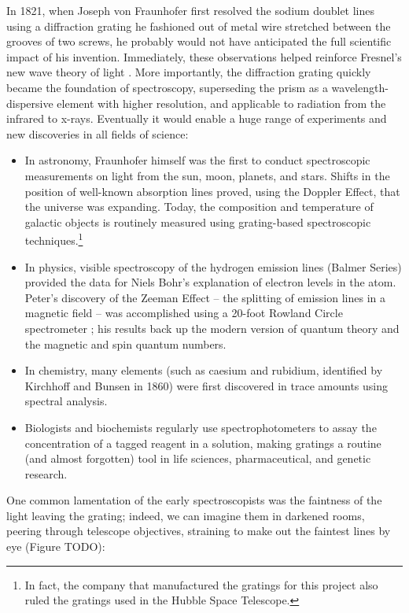 In 1821, when Joseph von Fraunhofer first resolved the sodium doublet lines using a diffraction grating he fashioned out of metal wire stretched between the grooves of two screws, he probably would not have anticipated the full scientific impact of his invention.
Immediately, these observations helped reinforce Fresnel's new wave theory of light \cite{Fra23}. %
More importantly, the diffraction grating quickly became the foundation of spectroscopy, superseding the prism as a wavelength-dispersive element with higher resolution, and applicable to radiation from the infrared to x-rays.  Eventually it would enable a huge range of experiments and new discoveries in all fields of science:
\begin{itemize}
\item In astronomy, Fraunhofer himself was the first to conduct spectroscopic measurements on light from the sun, moon, planets, and stars.  Shifts in the position of well-known absorption lines proved, using the Doppler Effect, that the universe was expanding.  Today, the composition and temperature of galactic objects is routinely measured using grating-based spectroscopic techniques.\footnote{In fact, the company that manufactured the gratings for this project also ruled the gratings used in the Hubble Space Telescope.}
\item In physics, visible spectroscopy of the hydrogen emission lines (Balmer Series) provided the data for Niels Bohr's explanation of electron levels in the atom.  Peter's discovery of the Zeeman Effect -- the splitting of emission lines in a magnetic field -- was accomplished using a 20-foot Rowland Circle spectrometer \cite{Zee97}; his results back up the modern version of quantum theory and the magnetic and spin quantum numbers.
\item In chemistry, many elements (such as caesium and rubidium, identified by Kirchhoff and Bunsen in 1860) were first discovered in trace amounts using spectral analysis.
\item Biologists and biochemists regularly use spectrophotometers to assay the concentration of a tagged reagent in a solution, making gratings a routine (and almost forgotten) tool in life sciences, pharmaceutical, and genetic research.
\end{itemize}

One common lamentation of the early spectroscopists was the faintness of the light leaving the grating; indeed, we can imagine them in darkened rooms, peering through telescope objectives,  straining to make out the faintest lines by eye (Figure TODO):

